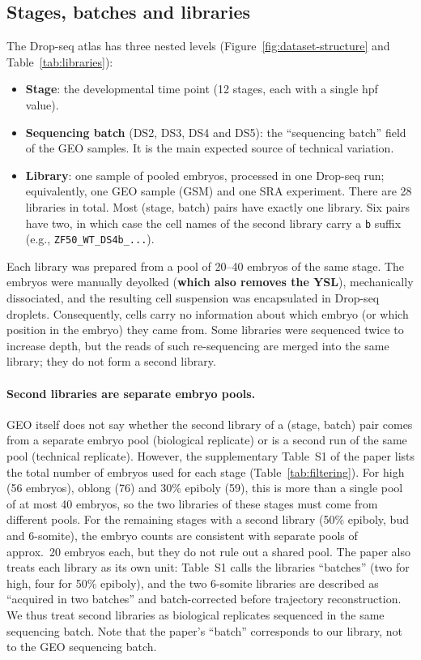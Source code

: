\documentclass[11pt,a4paper]{article}
\begin{document}
\subsection{Stages, batches and libraries}

The Drop-seq atlas has three nested levels (Figure~\ref{fig:dataset-structure} and Table~\ref{tab:libraries}):
\begin{itemize}
	\item \textbf{Stage}: the developmental time point (12 stages, each with a single hpf value).
	\item \textbf{Sequencing batch} (DS2, DS3, DS4 and DS5): the ``sequencing batch'' field of the GEO samples. It is the main expected source of technical variation.
	\item \textbf{Library}: one sample of pooled embryos, processed in one Drop-seq run; equivalently, one GEO sample (GSM) and one SRA experiment. There are 28 libraries in total. Most (stage, batch) pairs have exactly one library. Six pairs have two, in which case the cell names of the second library carry a \texttt{b} suffix (e.g., \texttt{ZF50\_WT\_DS4b\_...}).
\end{itemize}

Each library was prepared from a pool of 20--40 embryos of the same stage. The embryos were manually deyolked (\textbf{which also removes the YSL}), mechanically dissociated, and the resulting cell suspension was encapsulated in Drop-seq droplets. Consequently, cells carry no information about which embryo (or which position in the embryo) they came from. Some libraries were sequenced twice to increase depth, but the reads of such re-sequencing are merged into the same library; they do not form a second library.

\paragraph{Second libraries are separate embryo pools.} GEO itself does not say whether the second library of a (stage, batch) pair comes from a separate embryo pool (biological replicate) or is a second run of the same pool (technical replicate). However, the supplementary Table~S1 of the paper lists the total number of embryos used for each stage (Table~\ref{tab:filtering}). For high (56 embryos), oblong (76) and 30\% epiboly (59), this is more than a single pool of at most 40 embryos, so the two libraries of these stages must come from different pools. For the remaining stages with a second library (50\% epiboly, bud and 6-somite), the embryo counts are consistent with separate pools of approx.~20 embryos each, but they do not rule out a shared pool. The paper also treats each library as its own unit: Table~S1 calls the libraries ``batches'' (two for high, four for 50\% epiboly), and the two 6-somite libraries are described as ``acquired in two batches'' and batch-corrected before trajectory reconstruction. We thus treat second libraries as biological replicates sequenced in the same sequencing batch. Note that the paper's ``batch'' corresponds to our library, not to the GEO sequencing batch.
\end{document}

